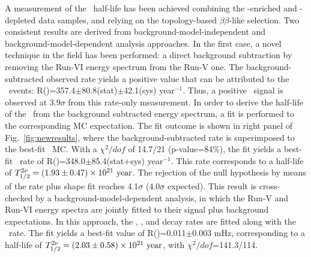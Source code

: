 
A measurement of the  \bbtnu ~half-life has been achieved combining the -enriched and -depleted data samples, and relying on the topology-based $\beta\beta$-like selection. Two consistent results are derived from background-model-independent and background-model-dependent analysis approaches. In the first case, a novel technique in the field has been performed: a direct background subtraction by removing the Run-VI energy spectrum from the Run-V one. The background-subtracted observed rate yields a positive value that can be attributed to the \bbtnu ~events: R()=357.4$\pm$80.8(stat)$\pm$42.1(sys) year$^{-1}$. Thus, a positive \bbtnu ~signal is observed at 3.9$\sigma$ from this rate-only measurement. In order to derive the half-life of the  \bbtnu\ from the background subtracted energy spectrum, a fit is performed to the corresponding MC expectation. The fit outcome is shown in right panel of Fig.~\ref{fig:newresults}, where the background-subtracted rate is superimposed to the best-fit \bbtnu ~MC. With a $\chi^{2}/dof$ of 14.7/21 (p-value=84\%), the fit yields a best-fit \bbtnu ~rate of R()=348.0$\pm$85.4(stat+sys) year$^{-1}$. This rate corresponds to a half-life of $T_{1/2}^{2\nu}=(1.93\pm0.47)\times10^{21}~\textrm{year}$. The rejection of the null hypothesis by means of the rate plus shape fit reaches 4.1$\sigma$ (4.0$\sigma$ expected). This result is cross-checked by a background-model-dependent analysis, in which the Run-V and Run-VI energy spectra are jointly fitted to their signal plus background expectations. In this approach, the , ,  and  decay rates are fitted along with the \bbtnu ~rate. The fit yields a best-fit value of R()=0.011$\pm$0.003 mHz, corresponding to a half-life of $T_{1/2}^{2\nu}=(2.03\pm0.58)\times10^{21}~\textrm{year}$, with $\chi^2/dof$=141.3/114.


